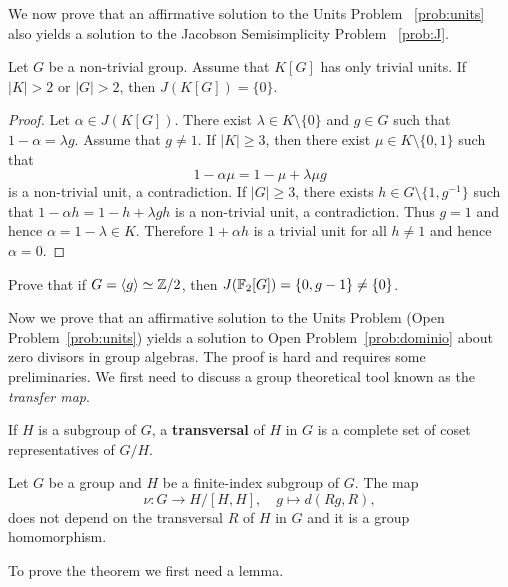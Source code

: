 We now prove that an affirmative solution to the Units Problem
~\ref{prob:units} also yields a solution to the Jacobson Semisimplicity Problem
~\ref{prob:J}. 

\begin{theorem}
	Let $G$ be a non-trivial group. Assume that $K[G]$ has only trivial units. 
	If $|K|>2$ or $|G|>2$, then $J(K[G])=\{0\}$.
\end{theorem}

\begin{proof}
	Let $\alpha\in J(K[G])$. There exist $\lambda\in K\setminus\{0\}$ and $g\in
	G$ such that $1-\alpha=\lambda g$. Assume that $g\ne 1$.  If $|K|\geq3$,
	then there exist $\mu\in K\setminus\{0,1\}$ such that
	\[
		1-\alpha\mu=1-\mu+\lambda\mu g 
	\]
	is a non-trivial unit, a contradiction.
	If $|G|\geq3$, there exists $h\in G\setminus\{1,g^{-1}\}$ such that
	$1-\alpha h=1-h+\lambda gh$ is a non-trivial unit, a contradiction.  Thus
	$g=1$ and hence $\alpha=1-\lambda\in K$. Therefore $1+\alpha h$ is a
	trivial unit for all $h\ne 1$ and hence 	$\alpha=0$.
\end{proof}

\begin{exercise}
	Prove that if $G=\langle g\rangle\simeq\mathbb{Z}/2$, then 
	$J(\mathbb{F}_2[G])=\{0,g-1\}\ne\{0\}$. 
\end{exercise}


Now we prove that an affirmative solution 
to the Units Problem 
(Open Problem~\ref{prob:units}) 
yields a solution to 
Open Problem~\ref{prob:dominio} about zero divisors in group algebras.
The proof is hard and requires some preliminaries. We first need
to discuss a group theoretical tool known as the \emph{transfer map}. 

If $H$ is a subgroup of $G$, a \textbf{transversal} of $H$ in $G$ is a complete
set of coset representatives of $G/H$. 

\begin{theorem}
	\label{thm:transfer}
	Let $G$ be a group and $H$ be a finite-index subgroup of $G$. The map 	
	\[
		\nu\colon G\to H/[H,H],\quad
		g\mapsto d(Rg,R),
	\]
	does not depend on the transversal $R$ of $H$ in $G$ and it is a group
	homomorphism. 
\end{theorem}

To prove the theorem we first need a lemma. 

